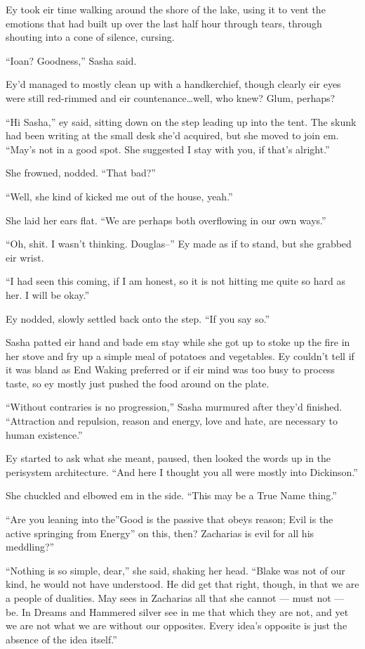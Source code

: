 Ey took eir time walking around the shore of the lake, using it to vent the emotions that had built up over the last half hour through tears, through shouting into a cone of silence, cursing.

``Ioan? Goodness,'' Sasha said.

Ey'd managed to mostly clean up with a handkerchief, though clearly eir eyes were still red-rimmed and eir countenance\ldots well, who knew? Glum, perhaps?

``Hi Sasha,'' ey said, sitting down on the step leading up into the tent. The skunk had been writing at the small desk she'd acquired, but she moved to join em. ``May's not in a good spot. She suggested I stay with you, if that's alright.''

She frowned, nodded. ``That bad?''

``Well, she kind of kicked me out of the house, yeah.''

She laid her ears flat. ``We are perhaps both overflowing in our own ways.''

``Oh, shit. I wasn't thinking. Douglas--'' Ey made as if to stand, but she grabbed eir wrist.

``I had seen this coming, if I am honest, so it is not hitting me quite so hard as her. I will be okay.''

Ey nodded, slowly settled back onto the step. ``If you say so.''

Sasha patted eir hand and bade em stay while she got up to stoke up the fire in her stove and fry up a simple meal of potatoes and vegetables. Ey couldn't tell if it was bland as End Waking preferred or if eir mind was too busy to process taste, so ey mostly just pushed the food around on the plate.

``Without contraries is no progression,'' Sasha murmured after they'd finished. ``Attraction and repulsion, reason and energy, love and hate, are necessary to human existence.''

Ey started to ask what she meant, paused, then looked the words up in the perisystem architecture. ``And here I thought you all were mostly into Dickinson.''

She chuckled and elbowed em in the side. ``This may be a True Name thing.''

``Are you leaning into the''Good is the passive that obeys reason; Evil is the active springing from Energy'' on this, then? Zacharias is evil for all his meddling?''

``Nothing is so simple, dear,'' she said, shaking her head. ``Blake was not of our kind, he would not have understood. He did get that right, though, in that we are a people of dualities. May sees in Zacharias all that she cannot — must not — be. In Dreams and Hammered silver see in me that which they are not, and yet we are not what we are without our opposites. Every idea's opposite is just the absence of the idea itself.''

